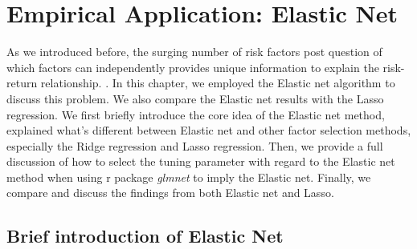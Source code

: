 \chapter{Empirical Application: Elastic Net}\label{Empirical:Elastic_net}
As we introduced before, the surging number of risk factors post question of which factors can independently provides unique information to explain the risk-return relationship. \cite{Cochrane2011}.
In this chapter, we employed the Elastic net algorithm to discuss this problem.
We also compare the Elastic net results with the Lasso regression.
We first briefly introduce the core idea of the Elastic net method, explained what's different between Elastic net and other factor selection methods, especially the Ridge regression and Lasso regression.
Then, we provide a full discussion of how to select the tuning parameter with regard to the Elastic net method when using r package \textit{glmnet} to imply the Elastic net.
Finally, we compare and discuss the findings from both Elastic net and Lasso.


\section{Brief introduction of Elastic Net} \label{Elastic_Net}

